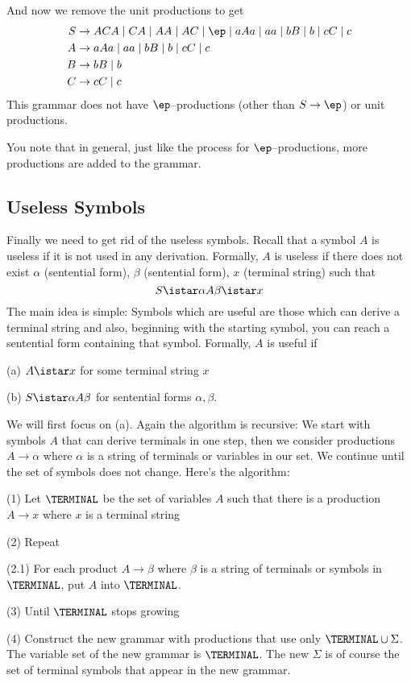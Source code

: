 And now we remove the unit productions to get
\begin{align*}
S &\rightarrow ACA \mid CA \mid AA \mid AC \mid \ep \mid aAa \mid aa \mid bB \mid b 
   \mid cC \mid c \\
A &\rightarrow aAa \mid aa \mid bB \mid b \mid cC \mid c \\
B &\rightarrow bB \mid b \\
C &\rightarrow cC \mid c
\end{align*}
This grammar does not have $\ep$--productions (other than $S \rightarrow \ep$)
or unit productions.

You note that in general, just like the process for $\ep$--productions, 
more productions are added to the grammar.

\newpage
\subsection{Useless Symbols}

Finally we need to get rid of the useless symbols. Recall that a
symbol $A$ is useless if it is not used in any derivation.
Formally, $A$ is useless if there does not exist $\alpha$
(sentential form), $\beta$ (sentential form), $x$ (terminal
string) such that
\[
 S \istar \alpha A \beta \istar x
\]
The main idea is simple: Symbols which are useful are those which
can derive a terminal string and also, beginning with the starting
symbol, you can reach a sentential form containing that symbol.
Formally, $A$ is useful if
\begin{mylist}
 \item[(a)] $A \istar x$ for some terminal string $x$
 \item[(b)] $S \istar \alpha A \beta$ for sentential forms
 $\alpha, \beta$.
\end{mylist}

We will first focus on (a). Again the algorithm is recursive: We
start with symbols $A$ that can derive terminals in one step, then
we consider productions $A \rightarrow \alpha$ where $\alpha$ is a
string of terminals or variables in our set. We continue until the
set of symbols does not change. Here's the algorithm:
\begin{mylist}
 \item[(1)] Let $\TERMINAL$ be the set of variables $A$ such that
 there is a production $A \rightarrow x$ where $x$ is a terminal
 string
 \item[(2)]  Repeat
 \begin{mylist}
  \item[(2.1)] For each product $A \rightarrow \beta$ where
  $\beta$ is a string of terminals or symbols in $\TERMINAL$, put $A$
  into $\TERMINAL$.
 \end{mylist}
 \item[(3)] Until $\TERMINAL$  stops growing
 \item[(4)] Construct the new grammar with productions that use only
 $\TERMINAL \cup \Sigma$. The variable set of the new grammar is
 $\TERMINAL$. The new $\Sigma$ is of course the set of terminal
 symbols that appear in the new grammar.
\end{mylist}

